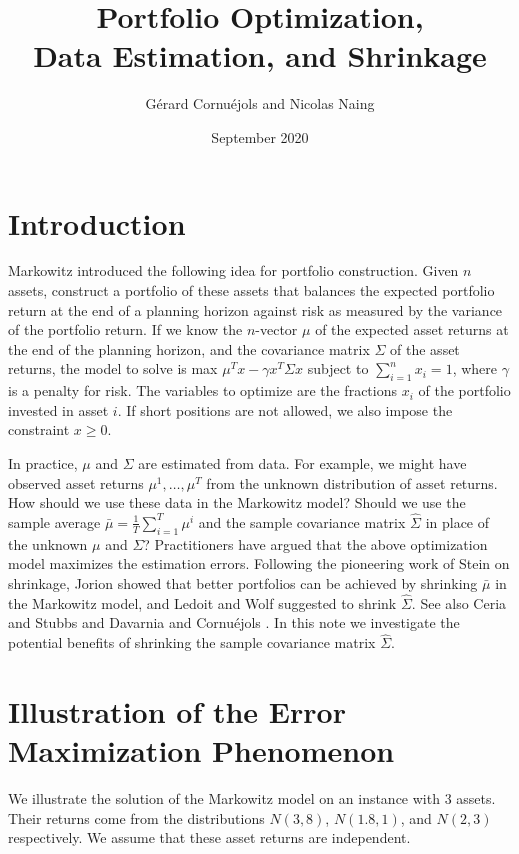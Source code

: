 \documentclass{article}
\title{Portfolio Optimization, \\ Data Estimation, and Shrinkage}
\author{G\'erard Cornu\'ejols and Nicolas Naing }
\date{September 2020}
\begin{document}
\maketitle

\section{Introduction}

Markowitz \cite{markowitz} introduced the following idea for portfolio construction. Given $n$ assets, construct a portfolio of these assets that
balances the expected portfolio return at the end of a planning horizon against risk as measured by the variance of the portfolio return.
If we know the $n$-vector $\mu$ of the expected asset returns at the end of the planning horizon, and the covariance matrix $\Sigma$ of
the asset returns, the model to solve is max $\mu^T x - \gamma x^T \Sigma x$ subject to $\sum_{i=1}^n x_i = 1$, where $\gamma$ is a penalty for risk.
The variables to optimize are the fractions $x_i$ of the portfolio invested in asset $i$. If short positions are not allowed, we also
impose the constraint $x \geq 0$.

In practice, $\mu$ and $\Sigma$ are estimated from data. For example, we might have observed asset returns $\mu^1, \ldots , \mu^T$ from the
unknown distribution of asset returns. How should we use these data in the Markowitz model?  Should we use the sample average
$\bar{\mu} = \frac{1}{T} \sum_{i=1}^T \mu^i$ and the sample covariance matrix $\hat{\Sigma}$ in place of the unknown $\mu$ and $\Sigma$?
Practitioners have argued that the above optimization model maximizes the estimation errors. Following the pioneering work of Stein \cite{stein}
on shrinkage, Jorion \cite{jorion} showed that better portfolios can be achieved by shrinking $\bar{\mu}$ in the Markowitz model,
and Ledoit and Wolf \cite{LedoW03} suggested to shrink $\hat{\Sigma}$. See also Ceria and Stubbs \cite{Ceria} and Davarnia and Cornu\'ejols \cite{ORL5}. In this note we investigate the potential benefits
of shrinking the sample covariance matrix $\hat{\Sigma}$.


\section{Illustration of the Error Maximization Phenomenon}

 We illustrate the   solution of the Markowitz model on an instance with $3$ assets.
  Their returns come from the distributions $N(3,8)$, $N(1.8,1)$, and  $N(2,3)$ respectively. We assume that these asset returns are independent.
\end{document}
